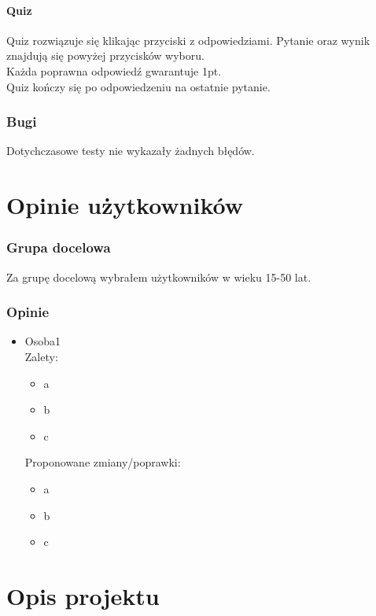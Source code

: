 \documentclass[12pt, a4paper]{article}
\begin{document}
\subsection{Quiz}
Quiz rozwiązuje się klikając przyciski z odpowiedziami. Pytanie oraz wynik znajdują się powyżej przycisków wyboru.\\
Każda poprawna odpowiedź gwarantuje 1pt.\\
Quiz kończy się po odpowiedzeniu na ostatnie pytanie.\\

\section{Bugi}
Dotychczasowe testy nie wykazały żadnych błędów.
\newpage


\part{Opinie użytkowników}
\section{Grupa docelowa}
Za grupę docelową wybrałem użytkowników w wieku 15-50 lat.
\section{Opinie}
\begin{itemize}
\item Osoba1\\
Zalety:
\begin{itemize}
\item a
\item b
\item c
\end{itemize}
Proponowane zmiany/poprawki:
\begin{itemize}
\item a
\item b
\item c
\end{itemize}
\end{itemize}

\part{Opis projektu}
\end{document}
